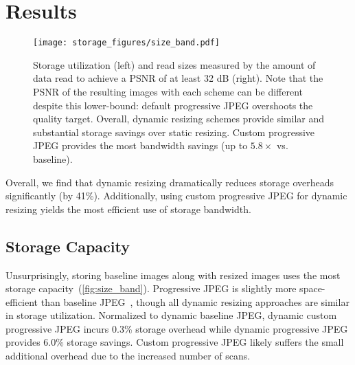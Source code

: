 \section{Results}
\begin{figure}[tb]
\texttt{[image: storage\_figures/size\_band.pdf]}
\caption{Storage utilization (left) and read sizes measured by the amount of data read to achieve a PSNR of at least 32 dB (right). %
Note that the PSNR of the resulting images with each scheme can be different despite this lower-bound: default progressive JPEG overshoots the quality target.
Overall, dynamic resizing schemes provide similar and substantial storage savings over static resizing.
Custom progressive JPEG provides the most bandwidth savings (up to $5.8\times$ vs. baseline).
}
\label{fig:size_band}
\end{figure}

Overall, we find that dynamic resizing dramatically reduces storage overheads significantly (by 41\%).
Additionally, using custom progressive JPEG for dynamic resizing yields the most efficient use of storage bandwidth.

\subsection{Storage Capacity}
Unsurprisingly, storing baseline images along with resized images uses the most storage capacity~(\autoref{fig:size_band}).
Progressive JPEG is slightly more space-efficient than baseline JPEG~\cite{souders2009even}, though all dynamic resizing approaches are similar in storage utilization.
Normalized to dynamic baseline JPEG, dynamic custom progressive JPEG incurs 0.3\% storage overhead while dynamic progressive JPEG provides 6.0\% storage savings.
Custom progressive JPEG likely suffers the small additional overhead due to the increased number of scans.

